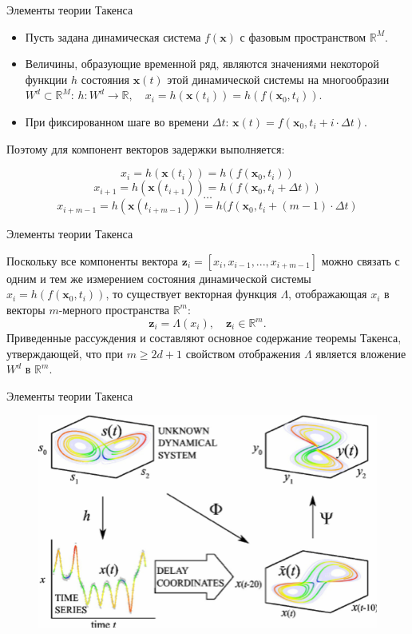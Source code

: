 \begin{frame}{Элементы теории Такенса}
\begin{itemize}
    \item Пусть задана динамическая система $f(\mathbf{x})$ с фазовым пространством $\mathbb{R}^M$.
    \item Величины, образующие временной ряд, являются значениями некоторой функции $h$ состояния $\mathbf{x}(t)$ этой динамической системы на многообразии $W^d \subset \mathbb{R}^M$: $h:W^d \rightarrow \mathbb{R}, \quad x_i = h(\mathbf{x}(t_i)) = h(f(\mathbf{x}_0,t_i))$. 
    \item При фиксированном шаге во времени $\Delta t$: $\mathbf{x}(t) = f(\mathbf{x}_0,t_i + i \cdot \Delta t)$.
\end{itemize}
Поэтому для компонент векторов задержки выполняется:

$$ x_i = h(\mathbf{x}(t_i)) = h(f(\mathbf{x}_0,t_i)) $$
$$ x_{i+1} = h(\mathbf{x}(t_{i+1})) = h(f(\mathbf{x}_0,t_i + \Delta t)) $$
$$ \dots $$
$$ x_{i+m-1} = h(\mathbf{x}(t_{i + m - 1})) = h(f(\mathbf{x}_0,t_i + (m-1)\cdot \Delta t) $$


\end{frame}
\begin{frame}{Элементы теории Такенса}

Поскольку все компоненты вектора $\mathbf{z}_i = [x_i, x_{i - 1}, ..., x_{i+m - 1}]$ можно связать с одним и тем же измерением состояния динамической системы $x_i =  h(f(\mathbf{x}_0,t_i))$, то существует векторная функция $\Lambda$, отображающая $x_i$ в векторы $m$-мерного пространства $\mathbb{R}^m$:
$$
\mathbf{z}_i = \Lambda(x_i),  \quad \mathbf{z}_i \in \mathbb{R}^m.
$$
Приведенные рассуждения и составляют основное содержание теоремы
Такенса, утверждающей, что при $m \geq 2d + 1$ свойством
отображения $\Lambda$ является вложение $W^d$ в $\mathbb{R}^m$.

\end{frame}
\begin{frame}{Элементы теории Такенса}
\begin{figure}
    \centering
    \includegraphics[width=\textwidth]{lecture_5/figs/CCM-1.png}
\end{figure}
\end{frame}
